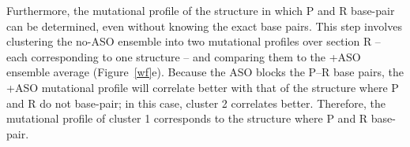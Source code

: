 \documentclass[main.tex]{subfiles}
\begin{document}
Furthermore, the mutational profile of the structure in which P and R base-pair can be determined, even without knowing the exact base pairs.
This step involves clustering the no-ASO ensemble into two mutational profiles over section R -- each corresponding to one structure -- and comparing them to the +ASO ensemble average (Figure~\ref{wf}e).
Because the ASO blocks the P--R base pairs, the +ASO mutational profile will correlate better with that of the structure where P and R do not base-pair; in this case, cluster 2 correlates better.
Therefore, the mutational profile of cluster 1 corresponds to the structure where P and R base-pair.

%
%
%
\end{document}
